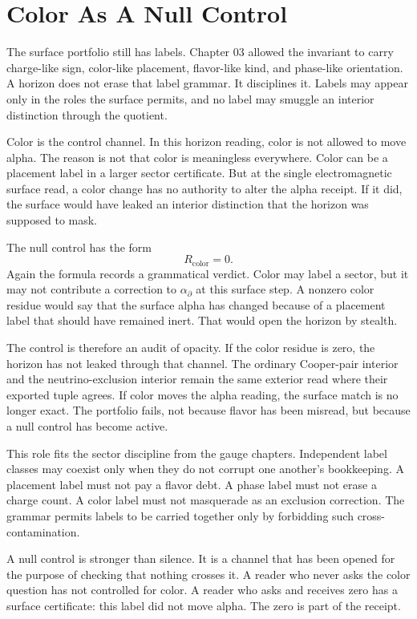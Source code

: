 \section{Color As A Null Control}

The surface portfolio still has labels. Chapter 03 allowed the invariant to
carry charge-like sign, color-like placement, flavor-like kind, and
phase-like orientation. A horizon does not erase that label grammar. It
disciplines it. Labels may appear only in the roles the surface permits, and
no label may smuggle an interior distinction through the quotient.

Color is the control channel. In this horizon reading, color is not allowed
to move alpha. The reason is not that color is meaningless everywhere. Color
can be a placement label in a larger sector certificate. But at the single
electromagnetic surface read, a color change has no authority to alter the
alpha receipt. If it did, the surface would have leaked an interior
distinction that the horizon was supposed to mask.

The null control has the form
\[
  R_{\mathrm{color}} = 0.
\]
Again the formula records a grammatical verdict. Color may label a sector,
but it may not contribute a correction to \(\alpha_{\partial}\) at this
surface step. A nonzero color residue would say that the surface alpha has
changed because of a placement label that should have remained inert. That
would open the horizon by stealth.

The control is therefore an audit of opacity. If the color residue is zero,
the horizon has not leaked through that channel. The ordinary Cooper-pair
interior and the neutrino-exclusion interior remain the same exterior read
where their exported tuple agrees. If color moves the alpha reading, the
surface match is no longer exact. The portfolio fails, not because flavor
has been misread, but because a null control has become active.

This role fits the sector discipline from the gauge chapters. Independent
label classes may coexist only when they do not corrupt one another's
bookkeeping. A placement label must not pay a flavor debt. A phase label
must not erase a charge count. A color label must not masquerade as an
exclusion correction. The grammar permits labels to be carried together
only by forbidding such cross-contamination.

A null control is stronger than silence. It is a channel that has been
opened for the purpose of checking that nothing crosses it. A reader who
never asks the color question has not controlled for color. A reader who
asks and receives zero has a surface certificate: this label did not move
alpha. The zero is part of the receipt.

